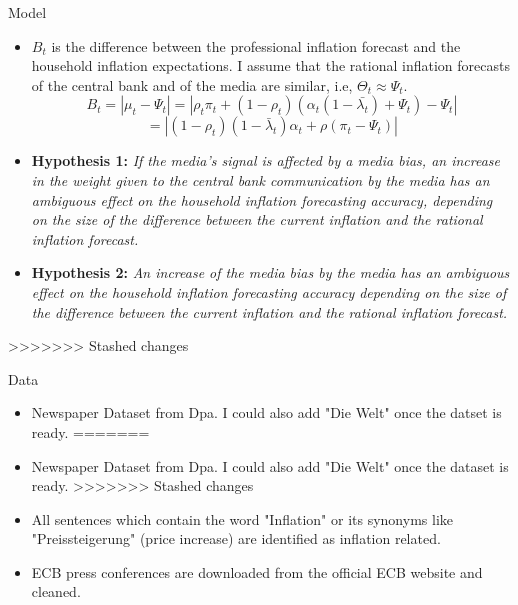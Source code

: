 \documentclass[aspectratio=169,xcolor=dvipsnames]{beamer}
\begin{document}
\begin{frame}{Model}

\begin{itemize}
	\item $B_t$ is the difference between the professional inflation forecast and the household inflation expectations. I assume that the rational inflation forecasts of the central bank and of the media are similar, i.e, $\Theta_t \approx \Psi_t$.
\begin{equation}
B_t = |\mu_t - \Psi_t| = |\rho_t \pi_t + (1-\rho_t)(\alpha_t(1- \bar{\lambda_t}) + \Psi_t) - \Psi_t|
\end{equation}
\begin{equation}
= |(1-\rho_t)(1-\bar{\lambda}_t)\alpha_t + \rho(\pi_t - \Psi_t)|
\end{equation}
	\item \textbf{Hypothesis 1:} \textit{If the media's signal is affected by a media bias, an increase in the weight given to the central bank communication by the media has an ambiguous effect on the household inflation forecasting accuracy, depending on the size of the difference between the current inflation and the rational inflation forecast.}
	\item \textbf{Hypothesis 2:} \textit{An increase of the media bias by the media has an ambiguous effect on the household inflation forecasting accuracy depending on the size of the difference between the current inflation and the rational inflation forecast.}

\end{itemize}

\end{frame}
>>>>>>> Stashed changes


\begin{frame}{Data}

\begin{itemize}
<<<<<<< Updated upstream
	\item Newspaper Dataset from Dpa. I could also add "Die Welt" once the datset is ready.
=======
	\item Newspaper Dataset from Dpa. I could also add "Die Welt" once the dataset is ready.
>>>>>>> Stashed changes
	\item All sentences which contain the word "Inflation" or its synonyms like "Preissteigerung" (price increase) are identified as inflation related.
	\item ECB press conferences are downloaded from the official ECB website and cleaned.
\end{itemize}

\end{frame}
\end{document}
